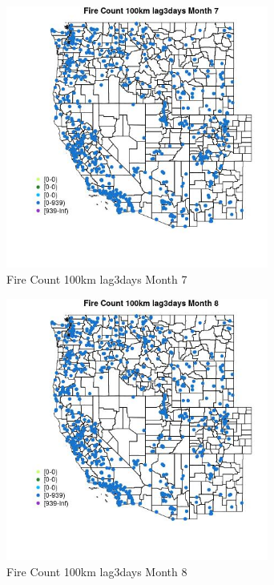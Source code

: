 \begin{figure} 
\centering  
\includegraphics[width=0.77\textwidth]{Code_Outputs/Report_ML_input_PM25_Step4_part_e_de_duplicated_aves_compiled_2019-05-21wNAs_MapObsMo7Fire_Count_100km_lag3days.jpg} 
\caption{\label{fig:Report_ML_input_PM25_Step4_part_e_de_duplicated_aves_compiled_2019-05-21wNAsMapObsMo7Fire_Count_100km_lag3days}Fire Count 100km lag3days Month 7} 
\end{figure} 
 

\begin{figure} 
\centering  
\includegraphics[width=0.77\textwidth]{Code_Outputs/Report_ML_input_PM25_Step4_part_e_de_duplicated_aves_compiled_2019-05-21wNAs_MapObsMo8Fire_Count_100km_lag3days.jpg} 
\caption{\label{fig:Report_ML_input_PM25_Step4_part_e_de_duplicated_aves_compiled_2019-05-21wNAsMapObsMo8Fire_Count_100km_lag3days}Fire Count 100km lag3days Month 8} 
\end{figure} 
 

